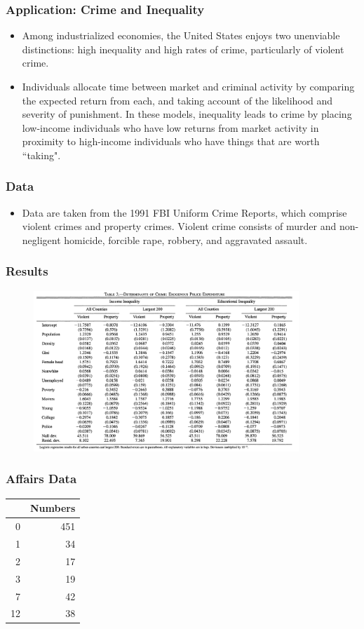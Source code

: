 \documentclass{beamer}
\newcommand{\1}{\mathbb{1}}
\begin{document}
\begin{frame}\frametitle{Application: Crime and Inequality}
\begin{itemize}
\item Among industrialized economies, the United States
enjoys two unenviable distinctions: high inequality and
high rates of crime, particularly of violent crime. 
\item Individuals allocate time between market and criminal activity by comparing the expected return
 from each, and taking account of the likelihood and severity of punishment. In these models, inequality leads to crime by placing low-income individuals who have low returns from market activity in proximity to high-income individuals who have things that are worth ``taking".
\end{itemize}
\end{frame}

\begin{frame}\frametitle{Data}
\begin{itemize}
\item Data are taken from the 1991 FBI Uniform Crime Reports, which comprise violent crimes and property crimes. Violent crime consists of murder and non-negligent homicide, forcible rape, robbery, and aggravated assault.
\end{itemize}
\end{frame}

\begin{frame}\frametitle{Results}
\begin{figure}
\includegraphics[width = 10cm]{Tables/tabcrime}
\end{figure}
\end{frame}

\begin{frame}\frametitle{Affairs Data}
\begin{table}[ht]
\centering
\begin{tabular}{rr}
  \hline
 & Numbers \\ 
  \hline
0 & 451 \\ 
  1 &  34 \\ 
  2 &  17 \\ 
  3 &  19 \\ 
  7 &  42 \\ 
  12 &  38 \\ 
   \hline
\end{tabular}
\end{table}
\end{frame}
\end{document}
